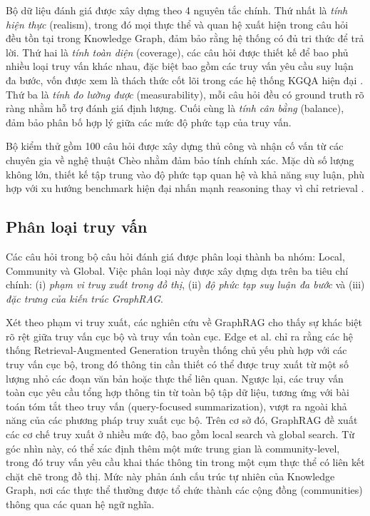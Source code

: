 Bộ dữ liệu đánh giá được xây dựng theo 4 nguyên tắc chính. Thứ nhất là \textit{tính hiện thực} (realism), trong đó mọi thực thể và quan hệ xuất hiện trong câu hỏi đều tồn tại trong Knowledge Graph, đảm bảo rằng hệ thống có đủ tri thức để trả lời. Thứ hai là \textit{tính toàn diện} (coverage), các câu hỏi được thiết kế để bao phủ nhiều loại truy vấn khác nhau, đặc biệt bao gồm các truy vấn yêu cầu suy luận đa bước, vốn được xem là thách thức cốt lõi trong các hệ thống KGQA hiện đại \cite{wang2023multihop}. Thứ ba là \textit{tính đo lường được} (measurability), mỗi câu hỏi đều có ground truth rõ ràng nhằm hỗ trợ đánh giá định lượng. Cuối cùng là \textit{tính cân bằng} (balance), đảm bảo phân bố hợp lý giữa các mức độ phức tạp của truy vấn.

Bộ kiểm thử gồm 100 câu hỏi được xây dựng thủ công và nhận cố vấn từ các chuyên gia về nghệ thuật Chèo nhằm đảm bảo tính chính xác. Mặc dù số lượng không lớn, thiết kế tập trung vào độ phức tạp quan hệ và khả năng suy luận, phù hợp với xu hướng benchmark hiện đại nhấn mạnh reasoning thay vì chỉ retrieval \cite{peng2025m3gqa}.

\subsection{Phân loại truy vấn}

Các câu hỏi trong bộ câu hỏi đánh giá được phân loại thành ba nhóm: Local, Community và Global. Việc phân loại này được xây dựng dựa trên ba tiêu chí chính: (i) \textit{phạm vi truy xuất trong đồ thị}, (ii) \textit{độ phức tạp suy luận đa bước} và (iii) \textit{đặc trưng của kiến trúc GraphRAG}.

Xét theo phạm vi truy xuất, các nghiên cứu về GraphRAG cho thấy sự khác biệt rõ rệt giữa truy vấn cục bộ và truy vấn toàn cục. Edge et al. \cite{edge2024graphrag} chỉ ra rằng các hệ thống Retrieval-Augmented Generation truyền thống chủ yếu phù hợp với các truy vấn cục bộ, trong đó thông tin cần thiết có thể được truy xuất từ một số lượng nhỏ các đoạn văn bản hoặc thực thể liên quan. Ngược lại, các truy vấn toàn cục yêu cầu tổng hợp thông tin từ toàn bộ tập dữ liệu, tương ứng với bài toán tóm tắt theo truy vấn (query-focused summarization), vượt ra ngoài khả năng của các phương pháp truy xuất cục bộ. Trên cơ sở đó, GraphRAG đề xuất các cơ chế truy xuất ở nhiều mức độ, bao gồm local search và global search. Từ góc nhìn này, có thể xác định thêm một mức trung gian là community-level, trong đó truy vấn yêu cầu khai thác thông tin trong một cụm thực thể có liên kết chặt chẽ trong đồ thị. Mức này phản ánh cấu trúc tự nhiên của Knowledge Graph, nơi các thực thể thường được tổ chức thành các cộng đồng (communities) thông qua các quan hệ ngữ nghĩa.

